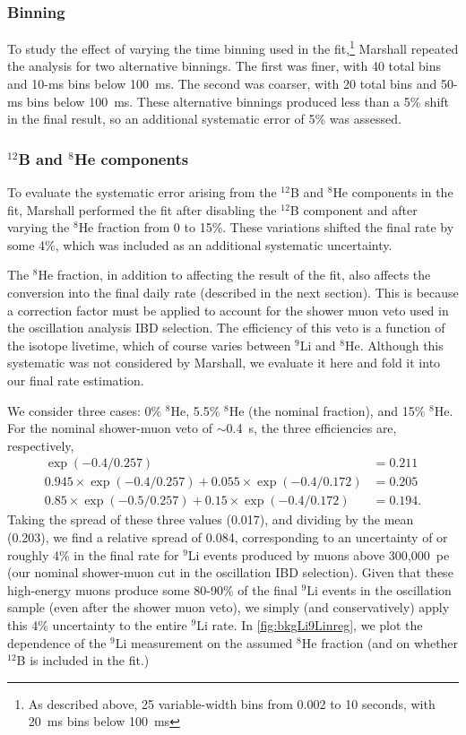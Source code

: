 \documentclass[../thesis.tex]{subfiles}
\begin{document}
\subsubsection{Binning}
\label{sec:bkgLi9Binning}

To study the effect of varying the time binning used in the fit,\footnote{As described above, 25 variable-width bins from 0.002 to 10 seconds, with 20~ms bins below 100~ms} Marshall repeated the analysis for two alternative binnings. The first was finer, with 40 total bins and 10-ms bins below 100~ms. The second was coarser, with 20 total bins and 50-ms bins below 100~ms. These alternative binnings produced less than a 5\% shift in the final result, so an additional systematic error of 5\% was assessed.

\subsubsection{$^{12}$B and $^8$He components}
\label{sec:bkgLi9B12unc}

To evaluate the systematic error arising from the $^{12}$B and $^8$He components in the fit, Marshall performed the fit after disabling the $^{12}$B component and after varying the $^8$He fraction from 0 to 15\%. These variations shifted the final rate by some 4\%, which was included as an additional systematic uncertainty.

The $^8$He fraction, in addition to affecting the result of the fit, also affects the conversion into the final daily rate (described in the next section). This is because a correction factor must be applied to account for the shower muon veto used in the oscillation analysis IBD selection. The efficiency of this veto is a function of the isotope livetime, which of course varies between $^9$Li and $^8$He. Although this systematic was not considered by Marshall, we evaluate it here and fold it into our final rate estimation.

We consider three cases: 0\% $^8$He, 5.5\% $^8$He (the nominal fraction), and 15\% $^8$He. For the nominal shower-muon veto of $\sim$0.4~s, the three efficiencies are, respectively,
\begin{align*}
  \exp(-0.4/0.257) &= 0.211 \\
  0.945 \times \exp(-0.4/0.257) + 0.055 \times \exp(-0.4/0.172) &= 0.205 \\
  0.85 \times \exp(-0.5/0.257) + 0.15 \times \exp(-0.4/0.172) &= 0.194.
\end{align*}
Taking the spread of these three values (0.017), and dividing by the mean (0.203), we find a relative spread of 0.084, corresponding to an uncertainty of or roughly 4\% in the final rate for $^9$Li events produced by muons above 300,000~pe (our nominal shower-muon cut in the oscillation IBD selection). Given that these high-energy muons produce some 80-90\% of the final $^9$Li events in the oscillation sample (even after the shower muon veto), we simply (and conservatively) apply this 4\% uncertainty to the entire $^9$Li rate. In \autoref{fig:bkgLi9Linreg}, we plot the dependence of the $^9$Li measurement on the assumed $^8$He fraction (and on whether $^{12}$B is included in the fit.)
\end{document}
